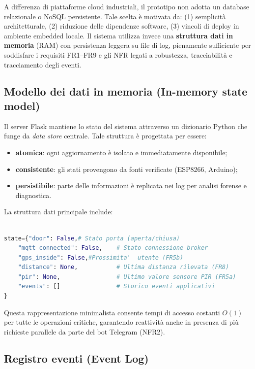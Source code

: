 A differenza di piattaforme cloud industriali, il prototipo non adotta un
database relazionale o NoSQL persistente. Tale scelta è motivata da:
(1) semplicità architetturale,
(2) riduzione delle dipendenze software,
(3) vincoli di deploy in ambiente embedded locale.
Il sistema utilizza invece una \textbf{struttura dati in memoria} (RAM) con
persistenza leggera su file di log, pienamente sufficiente per soddisfare
i requisiti FR1–FR9 e gli NFR legati a robustezza, tracciabilità e tracciamento
degli eventi.

\subsection*{Modello dei dati in memoria (In-memory state model)}

Il server Flask mantiene lo stato del sistema attraverso un dizionario Python
che funge da \textit{data store} centrale. Tale struttura è progettata per essere:

\begin{itemize}
    \item \textbf{atomica}: ogni aggiornamento è isolato e immediatamente disponibile;
    \item \textbf{consistente}: gli stati provengono da fonti verificate (ESP8266, Arduino);
    \item \textbf{persistibile}: parte delle informazioni è replicata nei log per analisi forense e diagnostica.
\end{itemize}

La struttura dati principale include:


\begin{lstlisting}[language=python]

state={"door": False,# Stato porta (aperta/chiusa)
    "mqtt_connected": False,    # Stato connessione broker
    "gps_inside": False,#Prossimita'  utente (FR5b)
    "distance": None,           # Ultima distanza rilevata (FR8)
    "pir": None,                # Ultimo valore sensore PIR (FR5a)
    "events": []                # Storico eventi applicativi
}
\end{lstlisting}

Questa rappresentazione minimalista consente tempi di accesso costanti $O(1)$
per tutte le operazioni critiche, garantendo reattività anche in presenza di più
richieste parallele da parte del bot Telegram (NFR2).

\subsection*{Registro eventi (Event Log)}

